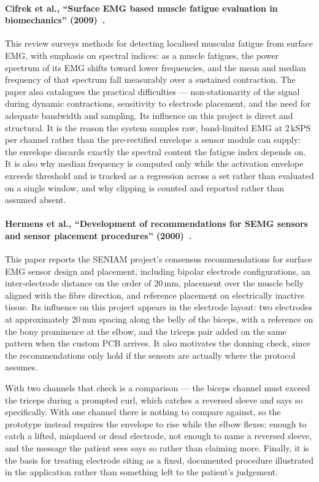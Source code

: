 \documentclass[11pt]{article}
\begin{document}
\paragraph{Cifrek et al., ``Surface EMG based muscle fatigue evaluation in
biomechanics'' (2009)~\cite{cifrek}.} This review surveys methods for detecting
localised muscular fatigue from surface EMG, with emphasis on spectral indices:
as a muscle fatigues, the power spectrum of its EMG shifts toward lower
frequencies, and the mean and median frequency of that spectrum fall measurably
over a sustained contraction. The paper also catalogues the practical
difficulties --- non-stationarity of the signal during dynamic contractions,
sensitivity to electrode placement, and the need for adequate bandwidth and
sampling. Its influence on this project is direct and structural. It is the
reason the system samples raw, band-limited EMG at 2\,kSPS per channel rather
than the pre-rectified envelope a sensor module can supply: the envelope
discards exactly the spectral content the fatigue index depends on. It is also
why median frequency is computed only while the activation envelope exceeds
threshold and is tracked as a regression across a set rather than evaluated on a
single window, and why clipping is counted and reported rather than assumed
absent.

\paragraph{Hermens et al., ``Development of recommendations for SEMG sensors and
sensor placement procedures'' (2000)~\cite{hermens}.} This paper reports the
SENIAM project's consensus recommendations for surface EMG sensor design and
placement, including bipolar electrode configurations, an inter-electrode
distance on the order of 20\,mm, placement over the muscle belly aligned with
the fibre direction, and reference placement on electrically inactive tissue.
Its influence on this project appears in the electrode layout: two electrodes
at approximately 20\,mm spacing along the belly of the biceps, with a reference
on the bony prominence at the elbow, and the triceps pair added on the same
pattern when the custom PCB arrives. It also motivates the donning check, since
the recommendations only hold if the sensors are actually where the protocol
assumes.

\medskip
\noindent
With two channels that check is a comparison --- the biceps channel must exceed
the triceps during a prompted curl, which catches a reversed sleeve and says so
specifically. With one channel there is nothing to compare against, so the
prototype instead requires the envelope to rise while the elbow flexes: enough
to catch a lifted, misplaced or dead electrode, not enough to name a reversed
sleeve, and the message the patient sees says so rather than claiming more. Finally, it is the basis for treating electrode siting as a
fixed, documented procedure illustrated in the application rather than something
left to the patient's judgement.
\end{document}
